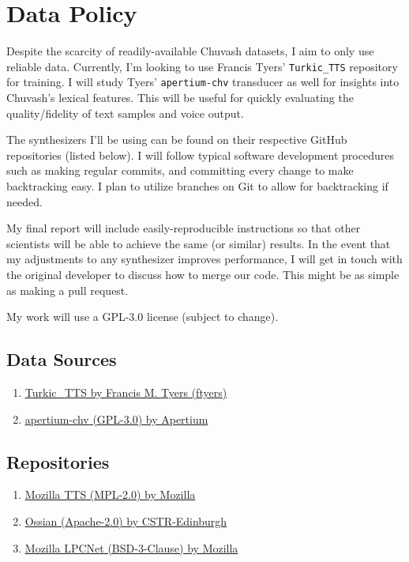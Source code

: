 \documentclass[fleqn,10pt]{SelfArx} %
\begin{document}
\section{Data Policy}
Despite the scarcity of readily-available Chuvash datasets, I aim to only use reliable data. Currently, I'm looking to use Francis Tyers' \texttt{Turkic\_TTS} repository for training. I will study Tyers' \texttt{apertium-chv} transducer as well for insights into Chuvash's lexical features. This will be useful for quickly evaluating the quality/fidelity of text samples and voice output.

The synthesizers I'll be using can be found on their respective GitHub repositories (listed below). I will follow typical software development procedures such as making regular commits, and committing every change to make backtracking easy. I plan to utilize branches on Git to allow for backtracking if needed.

My final report will include easily-reproducible instructions so that other scientists will be able to achieve the same (or similar) results. In the event that my adjustments to any synthesizer improves performance, I will get in touch with the original developer to discuss how to merge our code. This might be as simple as making a pull request.

My work will use a GPL-3.0 license (subject to change).

\subsection{Data Sources}
\begin{enumerate}
	\item \href{https://github.com/ftyers/Turkic_TTS}{\underline{Turkic\_TTS} by Francis M. Tyers (ftyers)}
	\item \href{https://github.com/apertium/apertium-chv}{\underline{apertium-chv} (GPL-3.0) by Apertium}
\end{enumerate}

\subsection{Repositories}
\begin{enumerate}
	\item \href{https://github.com/mozilla/TTS}{\underline{Mozilla TTS} (MPL-2.0) by Mozilla}
	\item \href{https://github.com/CSTR-Edinburgh/Ossian}{\underline{Ossian} (Apache-2.0) by CSTR-Edinburgh}
	\item \href{https://github.com/mozilla/LPCNet}{\underline{Mozilla LPCNet} (BSD-3-Clause) by Mozilla}
\end{enumerate}
\end{document}
